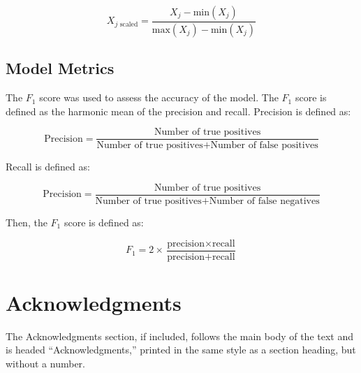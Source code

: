 \documentclass[a4paper,11pt]{article}
\begin{document}
\begin{equation}
	X_{j \text{ scaled}} = \frac{X_{j}-\text{min}(X_{j})}{\text{max}(X_{j})-\text{min}(X_{j})}
\end{equation}

\subsection{Model Metrics}

The $F_{1}$ score was used to assess the accuracy of the model. The $F_{1}$ score is defined as the harmonic mean of the precision and recall. Precision is defined as:

\begin{equation}
	\text{Precision} = \frac{ \text{Number of true positives} }{\text{Number of true positives} + \text{Number of false positives}}
\end{equation}

Recall is defined as:

\begin{equation}
	\text{Precision} = \frac{ \text{Number of true positives} }{\text{Number of true positives} + \text{Number of false negatives}}
\end{equation}

Then, the $F_{1}$ score is defined as:

\begin{equation}
	F_{1} = 2 \times \frac{\text{precision} \times \text{recall}}{\text{precision} + \text{recall}}
\end{equation}

\section*{Acknowledgments}

The Acknowledgments section, if included,
		       follows the main body of the text and is headed
		       ``Acknowledgments,'' printed in the same style
		       as a section heading, but without a number.




\end{document}

